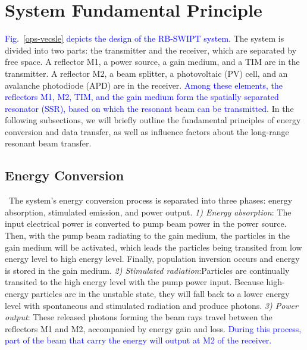 \documentclass{IEEEtran}
\begin{document}
\section{System Fundamental Principle}
\textcolor{blue}{Fig.~\ref{ops-vecsle} depicts the design of the RB-SWIPT system}. The system is divided into two parts: the transmitter and the receiver, which are separated by free space. A reflector M1, a power source, a gain medium, and a TIM are in the transmitter. A reflector M2, a beam splitter, a photovoltaic (PV) cell, and an avalanche photodiode (APD) are in the receiver. 
\textcolor{blue}{Among these elements, the reflectors M1, M2, TIM, and the gain medium form the spatially separated resonator (SSR), based on which the resonant beam can be transmitted. }
In the following subsections, we will briefly outline the fundamental principles of energy conversion and data transfer, as well as influence factors about the long-range resonant beam transfer.

\subsection{Energy Conversion}\
The system's energy conversion process is separated into three phases: energy absorption, stimulated emission, and power output.
\emph{1) Energy absorption}: The input electrical power is converted to pump beam power in the power source. Then, with the pump beam radiating to the gain medium, the particles in the gain medium will be activated, which leads the particles being transited from low energy level to high energy level. Finally, population inversion occurs and energy is stored in the gain medium. 
\emph{2) Stimulated radiation}:Particles are continually transited to the high energy level with the pump power input. Because high-energy particles are in the unstable state, they will fall back to a lower energy level with spontaneous and stimulated radiation and produce photons. 
\emph{3) Power output}: These released photons forming the beam rays travel between the reflectors M1 and M2, accompanied by energy gain and loss. \textcolor{blue}{During this process, part of the beam that carry the energy will output at M2 of the receiver.}
\end{document}
